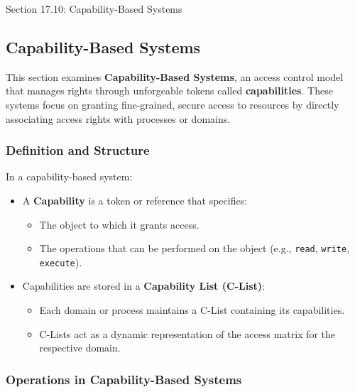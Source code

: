 \begin{notes}{Section 17.10: Capability-Based Systems}
    \subsection*{Capability-Based Systems}

    This section examines \textbf{Capability-Based Systems}, an access control model that manages rights through unforgeable tokens called \textbf{capabilities}. These systems focus on granting 
    fine-grained, secure access to resources by directly associating access rights with processes or domains.
    
    \subsubsection*{Definition and Structure}
    
    In a capability-based system:
    \begin{itemize}
        \item A \textbf{Capability} is a token or reference that specifies:
        \begin{itemize}
            \item The object to which it grants access.
            \item The operations that can be performed on the object (e.g., \texttt{read}, \texttt{write}, \texttt{execute}).
        \end{itemize}
        \item Capabilities are stored in a \textbf{Capability List (C-List)}:
        \begin{itemize}
            \item Each domain or process maintains a C-List containing its capabilities.
            \item C-Lists act as a dynamic representation of the access matrix for the respective domain.
        \end{itemize}
    \end{itemize}
    
    \subsubsection*{Operations in Capability-Based Systems}
    

\end{notes}

